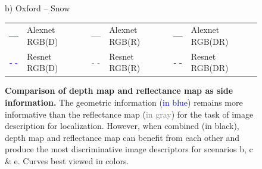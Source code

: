 \begin{figure}
\begin{minipage}{0.27\linewidth}
		b) Oxford -- Snow
	\end{minipage}
	
	\vspace{0.2cm}
	
	\begin{scriptsize}
	\begin{tabular}{c l c l c l }
		\textcolor{blue}{\textbf{\Large{---}}} & Alexnet RGB(D) & 
		\textcolor{gray}{\textbf{\Large{---}}} & Alexnet RGB(R) &
		\textbf{\Large{---}} & Alexnet RGB(DR) \\
		\textcolor{blue}{\Large{- -}} & Resnet RGB(D) & 
		\textcolor{gray}{\Large{- -}} & Resnet RGB(R) & 
		\Large{- -} & Resnet RGB(DR) \\
	\end{tabular}		
	\end{scriptsize}

	\caption[Comparison of depth map and reflectance map as side information]{\label{fig:ref_vs_depth} \textbf{Comparison of depth map and reflectance map as side information.} The geometric information (\textcolor{blue}{in blue}) remains more informative than the reflectance map (\textcolor{gray}{in gray}) for the task of image description for localization. However, when combined (in black), depth map and reflectance map can benefit from each other and produce the most discriminative image descriptors for scenarios b, c \& e. Curves best viewed in colors.}
	
\end{figure}